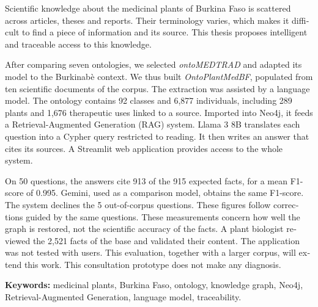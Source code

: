 \begin{otherlanguage}{english}
Scientific knowledge about the medicinal plants of Burkina Faso is scattered across articles, theses and reports. Their terminology varies, which makes it difficult to find a piece of information and its source. This thesis proposes intelligent and traceable access to this knowledge.

After comparing seven ontologies, we selected \textit{ontoMEDTRAD} and adapted its model to the Burkinabè context. We thus built \textit{OntoPlantMedBF}, populated from ten scientific documents of the corpus. The extraction was assisted by a language model. The ontology contains 92 classes and 6,877 individuals, including 289 plants and 1,676 therapeutic uses linked to a source. Imported into Neo4j, it feeds a Retrieval-Augmented Generation (RAG) system. Llama 3 8B translates each question into a Cypher query restricted to reading. It then writes an answer that cites its sources. A Streamlit web application provides access to the whole system.

On 50 questions, the answers cite 913 of the 915 expected facts, for a mean F1-score of 0.995. Gemini, used as a comparison model, obtains the same F1-score. The system declines the 5 out-of-corpus questions. These figures follow corrections guided by the same questions. These measurements concern how well the graph is restored, not the scientific accuracy of the facts. A plant biologist reviewed the 2,521 facts of the base and validated their content. The application was not tested with users. This evaluation, together with a larger corpus, will extend this work. This consultation prototype does not make any diagnosis.

\vspace{1em}
\noindent\textbf{Keywords:} medicinal plants, Burkina Faso, ontology, knowledge graph, Neo4j, Retrieval-Augmented Generation, language model, traceability.
\end{otherlanguage}
